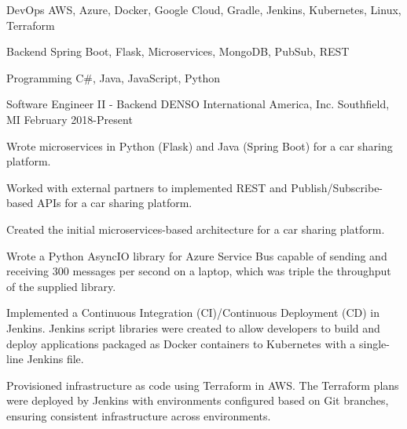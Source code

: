 \documentclass[11pt, a4paper]{awesome-cv}
\begin{document}
\makecvheader[C]


\begin{cvskills}
    \cvskill
    {DevOps}
    {AWS, Azure, Docker, Google Cloud, Gradle, Jenkins, Kubernetes, Linux, Terraform}

    \cvskill
    {Backend}
    {Spring Boot, Flask, Microservices, MongoDB, PubSub, REST}

    \cvskill
    {Programming}
    {C\#, Java, JavaScript, Python}
\end{cvskills}

\begin{cventries}
    \cventry
    {Software Engineer II - Backend}
    {DENSO International America, Inc.}
    {Southfield, MI}
    {February 2018-Present}
    {
        \begin{cvitems}
            \item{Wrote microservices in Python (Flask) and Java (Spring Boot) for a car sharing platform.}
            \item{Worked with external partners to implemented REST and Publish/Subscribe-based APIs for a car sharing platform.}
            \item{Created the initial microservices-based architecture for a car sharing platform.}
            \item{Wrote a Python AsyncIO library for Azure Service Bus capable of sending and receiving 300 messages per second on a laptop, which was triple the throughput of the supplied library.}
            \item{Implemented a Continuous Integration (CI)/Continuous Deployment (CD) in Jenkins. Jenkins script libraries were created to allow developers to build and deploy applications packaged as Docker containers to Kubernetes with a single-line Jenkins file.}
            \item{Provisioned infrastructure as code using Terraform in AWS. The Terraform plans were deployed by Jenkins with environments configured based on Git branches, ensuring consistent infrastructure across environments.}
        \end{cvitems}
    }


\end{cventries}
\end{document}
